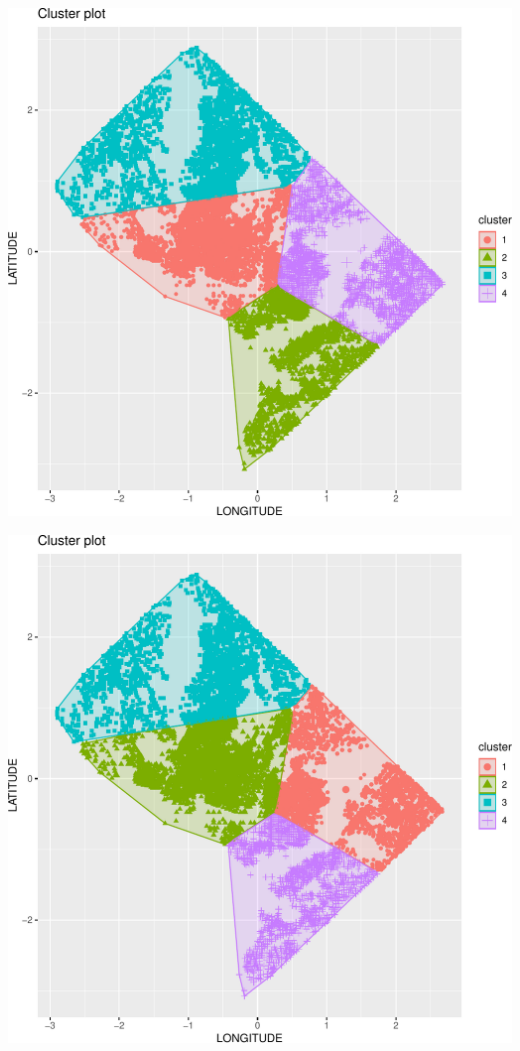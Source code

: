 \documentclass[
]{article}
\begin{document}
\begin{center}\includegraphics{./figures/unnamed-chunk-4-1} \end{center}

\begin{center}\includegraphics{./figures/unnamed-chunk-4-2} \end{center}
\end{document}
